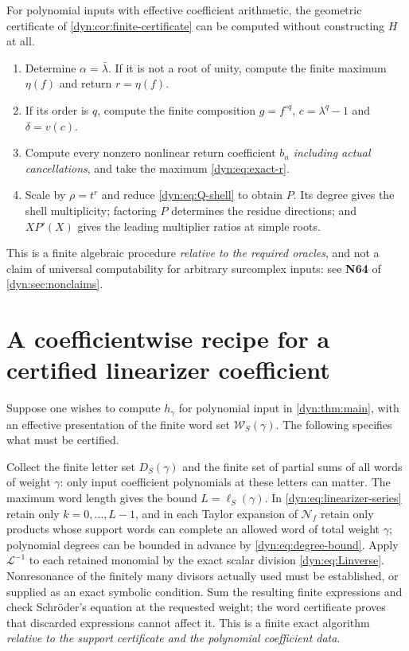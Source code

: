 \documentclass[11pt,letterpaper]{article}
\theoremstyle{definition}
\theoremstyle{remark}
\newcommand{\word}{\mathcal W}
\newcommand{\Li}{\mathcal L}
\newcommand{\NN}{\mathcal N}
\numberwithin{equation}{section}
\begin{document}
For polynomial inputs with effective coefficient arithmetic, the geometric
certificate of \cref{dyn:cor:finite-certificate} can be computed without
constructing $H$ at all.
\begin{enumerate}[label=\arabic*.]
\item Determine $\alpha=\bar\lambda$. If it is not a root of unity, compute
the finite maximum $\eta(f)$ and return $r=\eta(f)$.
\item If its order is $q$, compute the finite composition $g=f^{\circ q}$,
$c=\lambda^{q}-1$ and $\delta=v(c)$.
\item Compute every nonzero nonlinear return coefficient $b_n$
\emph{including actual cancellations}, and take the maximum
\eqref{dyn:eq:exact-r}.
\item Scale by $\rho=t^{r}$ and reduce \eqref{dyn:eq:Q-shell} to obtain
$P$. Its degree gives the shell multiplicity; factoring $P$ determines the
residue directions; and $XP'(X)$ gives the leading multiplier ratios at
simple roots.
\end{enumerate}
This is a finite algebraic procedure \emph{relative to the required
oracles}, and not a claim of universal computability for arbitrary
surcomplex inputs: see \textbf{N64} of \cref{dyn:sec:nonclaims}.

\section{A coefficientwise recipe for a certified linearizer coefficient}
\label{dyn:app:recipe}

Suppose one wishes to compute $h_\gamma$ for polynomial input in
\cref{dyn:thm:main}, with an effective presentation of the finite word set
$\word_S(\gamma)$. The following specifies what must be certified.

Collect the finite letter set $D_S(\gamma)$ and the finite set of partial
sums of all words of weight $\gamma$: only input coefficient polynomials at
these letters can matter. The maximum word length gives the bound
$L=\ell_S(\gamma)$. In \eqref{dyn:eq:linearizer-series} retain only
$k=0,\dots,L-1$, and in each Taylor expansion of $\NN_f$ retain only
products whose support words can complete an allowed word of total weight
$\gamma$; polynomial degrees can be bounded in advance by
\eqref{dyn:eq:degree-bound}. Apply $\Li^{-1}$ to each retained monomial by
the exact scalar division \eqref{dyn:eq:Linverse}. Nonresonance of the
finitely many divisors actually used must be established, or supplied as an
exact symbolic condition. Sum the resulting finite expressions and check
Schr\"oder's equation at the requested weight; the word certificate proves
that discarded expressions cannot affect it. This is a finite exact
algorithm \emph{relative to the support certificate and the polynomial
coefficient data}.
\end{document}
